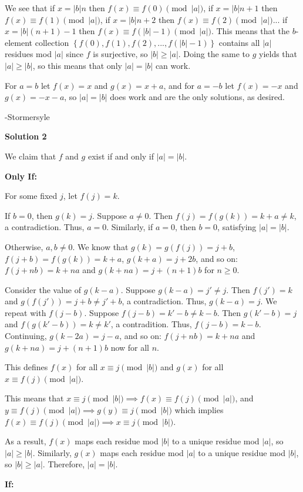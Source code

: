\begin{enumerate}
 We see that if $x=|b|n$ then $f(x)\equiv f(0) \pmod{|a|}$, if $x=|b|n+1$ then $f(x)\equiv f(1)\pmod{|a|}$, if $x=|b|n+2$ then $f(x)\equiv f(2)\pmod{|a|}$... if $x=|b|(n+1)-1$ then $f(x)\equiv f(|b|-1)\pmod{|a|}$. This means that the $b$-element collection $\left\{f(0), f(1), f(2), ... ,f(|b|-1)\right\}$ contains all $|a|$ residues mod $|a|$ since $f$ is surjective, so $|b|\ge |a|$. Doing the same to $g$ yields that $|a|\ge |b|$, so this means that only $|a|=|b|$ can work.

 For $a=b$ let $f(x)=x$ and $g(x)=x+a$, and for $a=-b$ let $f(x)=-x$ and $g(x)=-x-a$, so  $|a|=|b|$ does work and are the only solutions, as desired.

 -Stormersyle

 



\textbf{Solution 2}

We claim that $f$ and $g$ exist if and only if $|a|=|b|$.

 \textbf{Only If:}

 For some fixed $j$, let $f(j)=k$.

 If $b=0$, then $g(k)=j$. Suppose $a\ne 0$. Then $f(j)=f(g(k))=k+a\ne k$, a contradiction. Thus, $a=0$. Similarly, if $a=0$, then $b=0$, satisfying $|a|=|b|$.

 Otherwise, $a,b\ne 0$. We know that $g(k)=g(f(j))=j+b$, $f(j+b)=f(g(k))=k+a$, $g(k+a)=j+2b$, and so on: $f(j+nb)=k+na$ and $g(k+na)=j+(n+1)b$ for $n\ge 0$.

 Consider the value of $g(k-a)$. Suppose $g(k-a)=j'\ne j$. Then $f(j')=k$ and $g(f(j'))=j+b\ne j'+b$, a contradiction. Thus, $g(k-a)=j$. We repeat with $f(j-b)$. Suppose $f(j-b)=k'-b\ne k-b$. Then $g(k'-b)=j$ and $f(g(k'-b))=k\ne k'$, a contradition. Thus, $f(j-b)=k-b$. Continuing, $g(k-2a)=j-a$, and so on: $f(j+nb)=k+na$ and $g(k+na)=j+(n+1)b$ now for all $n$.

 This defines $f(x)$ for all $x\equiv j\pmod{|b|}$ and $g(x)$ for all $x\equiv f(j)\pmod{|a|}$.

 This means that $x\equiv j\pmod{|b|}\implies f(x)\equiv f(j)\pmod{|a|}$, and $y\equiv f(j)\pmod{|a|}\implies g(y)\equiv j\pmod{|b|}$ which implies $f(x)\equiv f(j)\pmod{|a|}\implies x\equiv j\pmod{|b|}$.

 As a result, $f(x)$ maps each residue mod $|b|$ to a unique residue mod $|a|$, so $|a|\ge|b|$. Similarly, $g(x)$ maps each residue mod $|a|$ to a unique residue mod $|b|$, so $|b|\ge|a|$. Therefore, $|a|=|b|$.

 \textbf{If:}


\end{enumerate}
